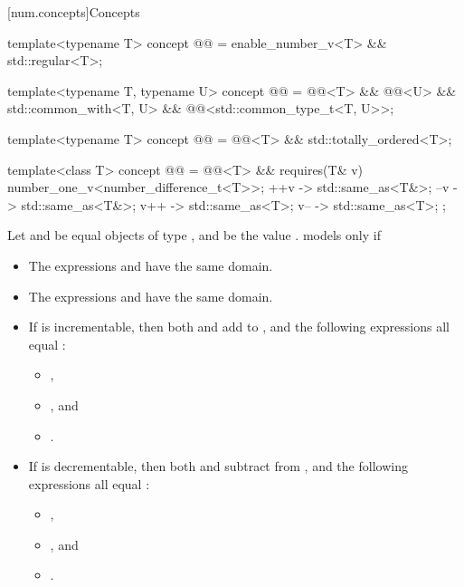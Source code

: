 [num.concepts]{Concepts}

\begin{itemdecl}
template<typename T>
concept @@ = enable_number_v<T> && std::regular<T>;

template<typename T, typename U>
concept @@ =
  @@<T> && @@<U> && std::common_with<T, U> && @@<std::common_type_t<T, U>>;

template<typename T>
concept @@ = @@<T> && std::totally_ordered<T>;
\end{itemdecl}

\begin{itemdecl}
template<class T>
concept @@ =
  @@<T> &&
  requires(T& v) {
    number_one_v<number_difference_t<T>>;
    { ++v } -> std::same_as<T&>;
    { --v } -> std::same_as<T&>;
    { v++ } -> std::same_as<T>;
    { v-- } -> std::same_as<T>;
  };
\end{itemdecl}

\begin{itemdescr}
\pnum
Let  and  be equal objects of type ,
and  be the value .
 models  only if
\begin{itemize}
\item
The expressions  and  have the same domain.
\item
The expressions  and  have the same domain.
\item
If  is incrementable,
then both  and  add  to ,
and the following expressions all equal :
\begin{itemize}
\item {},
\item {}, and
\item {}.
\end{itemize}
\item
If  is decrementable,
then both  and  subtract  from ,
and the following expressions all equal :
\begin{itemize}
\item {},
\item {}, and
\item {}.
\end{itemize}
\end{itemize}
\end{itemdescr}

